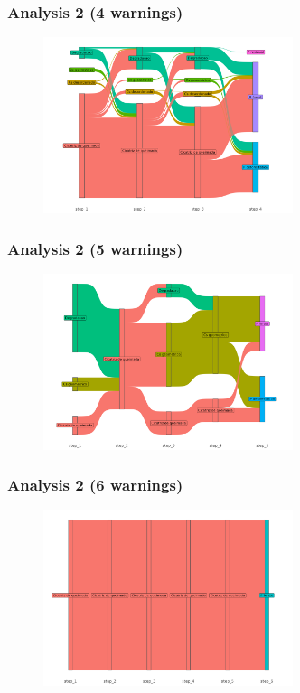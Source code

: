 \documentclass[aspectratio=169]{beamer}
\begin{document}
\begin{frame}
    \frametitle{Analysis 2 (4 warnings) }
    \begin{figure}[h] 
    \includegraphics[width=0.65\textwidth]{./figures/an2_plot_deter_prodes_subarea_trajectory_4.png}
    \end{figure}
\end{frame}

\begin{frame}
    \frametitle{Analysis 2 (5 warnings) }
    \begin{figure}[h] 
    \includegraphics[width=0.65\textwidth]{./figures/an2_plot_deter_prodes_subarea_trajectory_5.png}
    \end{figure}
\end{frame}

\begin{frame}
    \frametitle{Analysis 2 (6 warnings) }
    \begin{figure}[h] 
    \includegraphics[width=0.65\textwidth]{./figures/an2_plot_deter_prodes_subarea_trajectory_6.png}
    \end{figure}
\end{frame}
\end{document}

